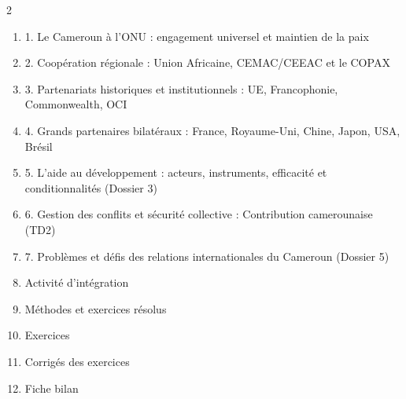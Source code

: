 \documentclass[11pt]{article}
\begin{document}
\begin{sommaire}
\begin{multicols}{2}
\begin{enumerate}
\item 1. Le Cameroun à l'ONU : engagement universel et maintien de la paix
\item 2. Coopération régionale : Union Africaine, CEMAC/CEEAC et le COPAX
\item 3. Partenariats historiques et institutionnels : UE, Francophonie, Commonwealth, OCI
\item 4. Grands partenaires bilatéraux : France, Royaume-Uni, Chine, Japon, USA, Brésil
\item 5. L'aide au développement : acteurs, instruments, efficacité et conditionnalités (Dossier 3)
\item 6. Gestion des conflits et sécurité collective : Contribution camerounaise (TD2)
\item 7. Problèmes et défis des relations internationales du Cameroun (Dossier 5)
\item Activité d'intégration
\item Méthodes et exercices résolus
\item Exercices
\item Corrigés des exercices
\item Fiche bilan
\end{enumerate}
\end{multicols}
\end{sommaire}
\end{document}
